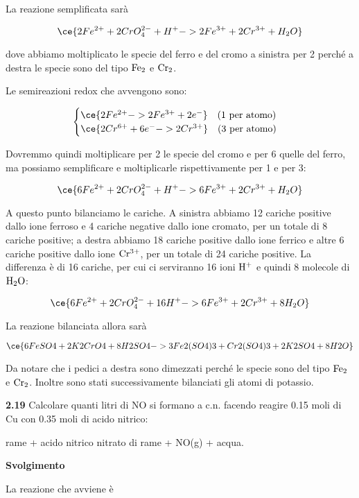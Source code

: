 La reazione semplificata sarà

$$\ce{2Fe^{2+} + 2CrO_4^{2-} + H^+ -> 2Fe^{3+} + 2Cr^{3+} + H_2O}$$

dove abbiamo moltiplicato le specie del ferro e del cromo a sinistra per 2 perché a destra le specie sono del tipo $\rm Fe_2$ e $\rm Cr_2$.

Le semireazioni redox che avvengono sono:

$$\begin{cases}
    \ce{2Fe^{2+} -> 2Fe^{3+} + 2e^-} \quad (\text{1 per atomo})\\
    \ce{2Cr^{6+} + 6e^- -> 2Cr^{3+}} \quad (\text{3 per atomo})
\end{cases}$$

Dovremmo quindi moltiplicare per 2 le specie del cromo e per 6 quelle del ferro, ma possiamo semplificare e moltiplicarle rispettivamente per 1 e per 3:

$$\ce{6Fe^{2+} + 2CrO_4^{2-} + H^+ -> 6Fe^{3+} + 2Cr^{3+} + H_2O}$$

A questo punto bilanciamo le cariche. A sinistra abbiamo 12 cariche positive dallo ione ferroso e 4 cariche negative dallo ione cromato, per un totale di 8 cariche positive; a destra abbiamo 18 cariche positive dallo ione ferrico e altre 6 cariche positive dallo ione $\rm Cr^{3+}$, per un totale di 24 cariche positive. La differenza è di 16 cariche, per cui ci serviranno 16 ioni $\rm H^+$ e quindi 8 molecole di $\rm H_2O$:

$$\ce{6Fe^{2+} + 2CrO_4^{2-} + 16H^+ -> 6Fe^{3+} + 2Cr^{3+} + 8H_2O}$$

La reazione bilanciata allora sarà

$$\ce{6FeSO4 + 2K2CrO4 + 8H2SO4 -> 3Fe2(SO4)3 + Cr2(SO4)3 + 2K2SO4 + 8H2O}$$

Da notare che i pedici a destra sono dimezzati perché le specie sono del tipo $\rm Fe_2$ e $\rm Cr_2$. Inoltre sono stati successivamente bilanciati gli atomi di potassio.

\vspace{0.2cm}\textbf{2.19} Calcolare quanti litri di NO si formano a c.n. facendo reagire 0.15 moli di Cu con 0.35 moli di acido nitrico:

\begin{center}
    rame + acido nitrico \ce{->} nitrato di rame + NO(g) + acqua.
\end{center} 

\large\textbf{Svolgimento}\normalsize

\vspace{0.2cm}La reazione che avviene è

